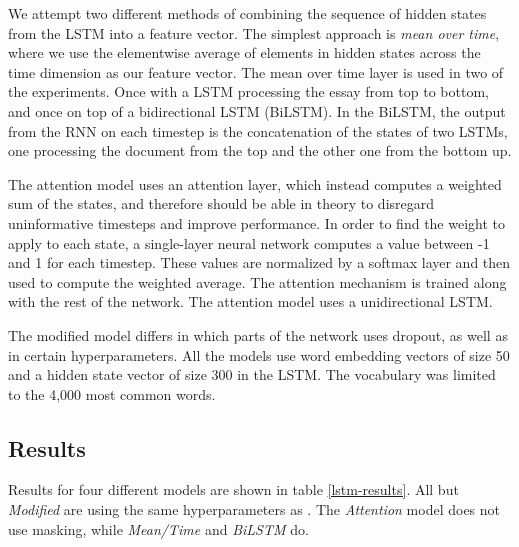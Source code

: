 We attempt two different methods of combining the sequence of hidden states
from the \ac{LSTM} into a feature vector. The simplest approach is \emph{mean
over time}, where we use the elementwise average of elements in hidden states
across the time dimension as our feature vector. The mean over time layer is
used in two of the experiments. Once with a \ac{LSTM} processing the essay
from top to bottom, and once on top of a bidirectional LSTM (BiLSTM). In the
BiLSTM, the output from the \ac{RNN} on each timestep is the concatenation of
the states of two \acp{LSTM}, one processing the document from the top and
the other one from the bottom up.

The attention model uses an attention layer, which instead computes a
weighted sum of the states, and therefore should be able in theory to
disregard uninformative timesteps and improve performance. In order to find
the weight to apply to each state, a single-layer neural network computes a
value between -1 and 1 for each timestep. These values are normalized by a
softmax layer and then used to compute the weighted average. The attention
mechanism is trained along with the rest of the network. The attention model
uses a unidirectional \ac{LSTM}.

The modified model differs in which parts of the network uses dropout, as
well as in certain hyperparameters. All the models use word embedding vectors
of size 50 and a hidden state vector of size 300 in the \ac{LSTM}. The
vocabulary was limited to the 4,000 most common words.

\subsection{Results}

Results for four different models are shown in table \ref{lstm-results}. All
but \emph{Modified} are using the same hyperparameters as
\citeauthor{taghipour16}. The \emph{Attention} model does not use masking,
while \emph{Mean/Time} and \emph{BiLSTM} do.

